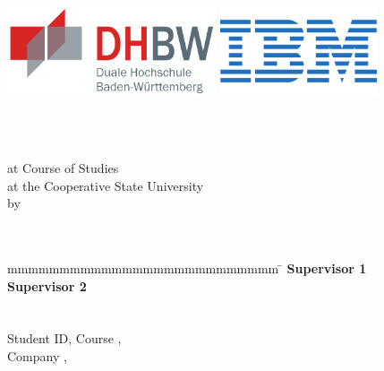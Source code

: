 \begin{titlepage}
	\begin{center}
		\includegraphics[height=2.6cm]{images/dhbw.png}
		\includegraphics[height=2.6cm]{images/ibm.jpg}
	\end{center}
	\enlargethispage{20mm}
	\begin{center}
	  \begin{spacing}{2}
	  \vspace*{9mm}	{\Large\bf \titel }\\
	  \end{spacing}
	  \vspace*{8mm}	{\large\bf \arbeit}\\

	  \vspace*{17mm}	at Course of Studies \studiengang\\
	  \vspace*{3mm} 	at the Cooperative State University \dhbw\\
	  \vspace*{12mm}	by\\
	  \vspace*{3mm} 	{\large\bf \autor}\\
	  \vspace*{12mm}	\datumAbgabe\\
	\end{center}
	\vfill
	\begin{spacing}{1.2}
	\begin{tabbing}
		mmmmmmmmmmmmmmmmmmmmmmmmmm     \= \kill
		\textbf{Supervisor 1}              \>  \betreuerA\\
		\textbf{Supervisor 2}              \>  \betreuerB\\
		\\
		\textbf{\autor}\\
		Student ID, Course  \>  \matrikelnr, \kurs\\
		Company      \>  \firma, \firmenort\\
		
		
	\end{tabbing}
	\end{spacing}
\end{titlepage}
